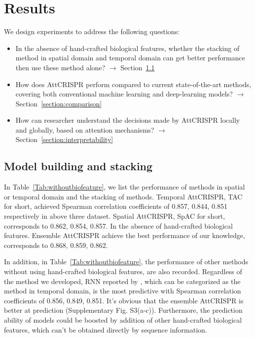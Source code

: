 \documentclass{bioinfo}
\begin{document}
\section{Results}

We design experiments to address the following questions:
\begin{itemize}
    \item 
    In the absence of hand-crafted biological features, whether the stacking of method in spatial domain and temporal domain can get better performance then use these method alone? 
    $\rightarrow$ Section~\ref{section:stacking}
    \item 
    How does AttCRISPR perform compared to current state-of-the-art methods, covering both conventional machine learning and deep-learning models? 
    $\rightarrow$ Section~\ref{section:comparison}
    \item 
    How can researcher understand the decisions made by AttCRISPR locally and globally, based on attention mechanisms? 
    $\rightarrow$ Section~\ref{section:interpretability}
    \vspace*{1pt}
\end{itemize}

\subsection{Model building and stacking}\label{section:stacking}

In Table~\ref{Tab:withoutbiofeature}, we list the performance of methods in spatial or temporal domain and the stacking of methods. 
Temporal AttCRISPR, TAC for short, achieved Spearman correlation coefficients of 0.857, 0.844, 0.851 respectively in above three dataset. 
Spatial AttCRISPR, SpAC for short, corresponds to 0.862, 0.854, 0.857. In the absence of hand-crafted biological features. 
Ensemble AttCRISPR achieve the best performance of our knowledge, corresponds to 0.868, 0.859, 0.862. 

In addition, in Table~\ref{Tab:withoutbiofeature}, the performance of other methods without using hand-crafted biological features, are also recorded. 
Regardless of the method we developed, RNN reported by \citeauthor{wang2019optimized}, which can be categorized as the method in temporal domain, 
is the most predictive with Spearman correlation coefficients of 0.856, 0.849, 0.851. 
It's obvious that the ensemble AttCRISPR is better at prediction (Supplementary Fig. S3(a-c)). 
Furthermore, the prediction ability of models could be boosted by addition of other hand-crafted biological features, which can't be obtained directly by sequence information. 
\end{document}
